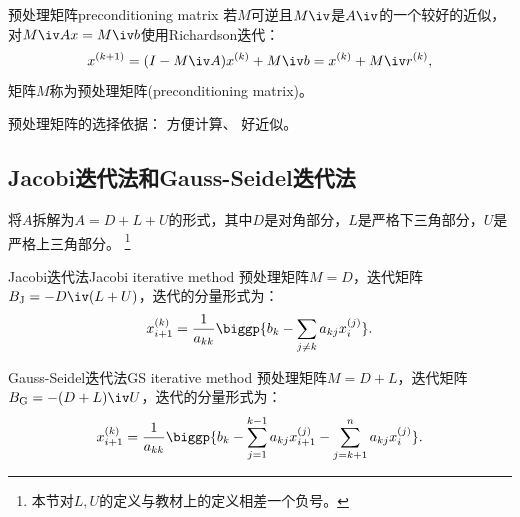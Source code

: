 \begin{definition}
    {预处理矩阵}{preconditioning matrix}
    若$M$可逆且$M\iv$是$A\iv$的一个较好的近似，对$M\iv Ax=M\iv b$使用Richardson迭代：
    \begin{equation}
        x^{(k+1)}=(I-M\iv A)x^{(k)}+M\iv b=x^{(k)}+M\iv r^{(k)},
    \end{equation}
    矩阵$M$称为预处理矩阵(preconditioning matrix)。
\end{definition}

\begin{remark}
    预处理矩阵的选择依据：
    方便计算、
    好近似。
\end{remark}

\subsection{Jacobi迭代法和Gauss-Seidel迭代法}

将$A$拆解为$A=D+L+U$的形式，其中$D$是对角部分，$L$是严格下三角部分，$U$是严格上三角部分。
\footnote{本节对$L,U$的定义与教材上的定义相差一个负号。}

\begin{example}
    {Jacobi迭代法}{Jacobi iterative method}
    预处理矩阵$M=D$，迭代矩阵$B_\text J=-D\iv(L+U)$，迭代的分量形式为：
    \begin{equation}
        x_{i+1}^{(k)}=\frac1{a_{kk}}\biggp{b_k-\sum_{j\neq k}a_{kj}x_i^{(j)}}.
    \end{equation}
\end{example}

\begin{example}
    {Gauss-Seidel迭代法}{GS iterative method}
    预处理矩阵$M=D+L$，迭代矩阵$B_\text G=-(D+L)\iv U$，迭代的分量形式为：
    \begin{equation}
        x_{i+1}^{(k)}=\frac1{a_{kk}}\biggp{b_k-\sum_{j=1}^{k-1}a_{kj}x_{i+1}^{(j)}-\sum_{j=k+1}^na_{kj}x_i^{(j)}}.
    \end{equation}
\end{example}

